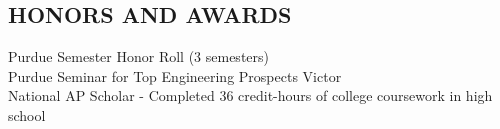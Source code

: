 \documentclass[10pt]{res}
\begin{document}
\begin{resume}
\vspace{-10pt}\section{HONORS AND AWARDS}          
  Purdue Semester Honor Roll (3 semesters) \\
  Purdue Seminar for Top Engineering Prospects Victor \\
  National AP Scholar - Completed 36 credit-hours of college coursework in high school \\

\end{resume}
\end{document}

